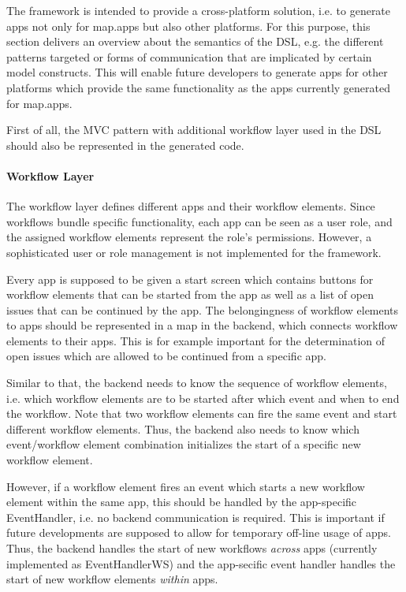 
The \MD framework is intended to provide a cross-platform solution, i.e. to generate apps not only for map.apps but also other platforms. For this purpose, this section delivers an overview about the semantics of the DSL, e.g. the different patterns targeted or forms of communication that are implicated by certain model constructs. This will enable future developers to generate apps for other platforms which provide the same functionality as the apps currently generated for map.apps.

First of all, the MVC pattern with additional workflow layer used in the DSL should also be represented in the generated code.

\paragraph{Workflow Layer}
The workflow layer defines different apps and their workflow elements. Since workflows bundle specific functionality, each app can be seen as a user role, and the assigned workflow elements represent the role's permissions. However, a sophisticated user or role management is not implemented for the \MD framework.

Every app is supposed to be given a start screen which contains buttons for workflow elements that can be started from the app as well as a list of open issues that can be continued by the app. The belongingness of workflow elements to apps should be represented in a map in the backend, which connects workflow elements to their apps. This is for example important for the determination of open issues which are allowed to be continued from a specific app.

Similar to that, the backend needs to know the sequence of workflow elements, i.e. which workflow elements are to be started after which event and when to end the workflow. Note that two workflow elements can fire the same event and start different workflow elements. Thus, the backend also needs to know which event/workflow element combination initializes the start of a specific new workflow element.

However, if a workflow element fires an event which starts a new workflow element within the same app, this should be handled by the app-specific EventHandler, i.e. no backend communication is required. This is important if future developments are supposed to allow for temporary off-line usage of apps. Thus, the backend handles the start of new workflows \textit{across} apps (currently implemented as EventHandlerWS) and the app-secific event handler handles the start of new workflow elements \textit{within} apps.


